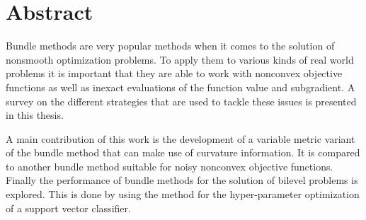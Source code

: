 \section*{Abstract}

Bundle methods are very popular methods when it comes to the solution of nonsmooth optimization problems. To apply them to various kinds of real world problems it is important that they are able to work with nonconvex objective functions as well as inexact evaluations of the function value and subgradient.
A survey on the different strategies that are used to tackle these issues is presented in this thesis.

A main contribution of this work is the development of a variable metric variant of the bundle method that can make use of curvature information.  
It is compared to another bundle method suitable for noisy nonconvex objective functions.
Finally the performance of bundle methods for the solution of bilevel problems is explored. This is done by using the method for the hyper-parameter optimization of a support vector classifier.



\thispagestyle{empty}